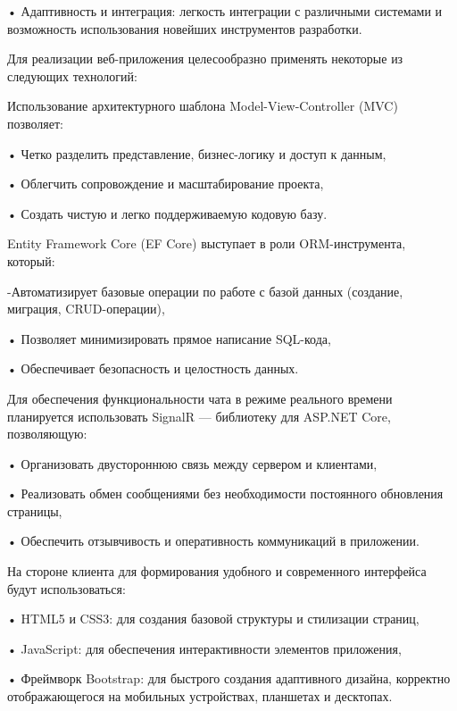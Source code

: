 {	\par \redline • Адаптивность и интеграция: легкость интеграции с различными системами и возможность использования новейших инструментов разработки.
	
	\par \redline Для реализации веб-приложения целесообразно применять некоторые из следующих технологий:
	
	\par \redline Использование архитектурного шаблона Model-View-Controller (MVC) позволяет:
	
	\par \redline • Четко разделить представление, бизнес-логику и доступ к данным,
	
	\par \redline • Облегчить сопровождение и масштабирование проекта,
	
	\par \redline • Создать чистую и легко поддерживаемую кодовую базу.
	
	\par \redline Entity Framework Core (EF Core) выступает в роли ORM-инструмента, который:
	
	\par \redline -Автоматизирует базовые операции по работе с базой данных (создание, миграция, CRUD-операции),
	
	\par \redline • Позволяет минимизировать прямое написание SQL-кода,
	
	\par \redline • Обеспечивает безопасность и целостность данных.
	
	\par \redline Для обеспечения функциональности чата в режиме реального времени планируется использовать SignalR — библиотеку для ASP.NET Core, позволяющую:
	
	\par \redline • Организовать двустороннюю связь между сервером и клиентами,
	
	\par \redline • Реализовать обмен сообщениями без необходимости постоянного обновления страницы,
	
	\par \redline • Обеспечить отзывчивость и оперативность коммуникаций в приложении.
	
	\par \redline На стороне клиента для формирования удобного и современного интерфейса будут использоваться:
	
	\par \redline • HTML5 и CSS3: для создания базовой структуры и стилизации страниц,
	
	\par \redline • JavaScript: для обеспечения интерактивности элементов приложения,
	
	\par \redline • Фреймворк Bootstrap: для быстрого создания адаптивного дизайна, корректно отображающегося на мобильных устройствах, планшетах и десктопах. 
	
	\par 
}



